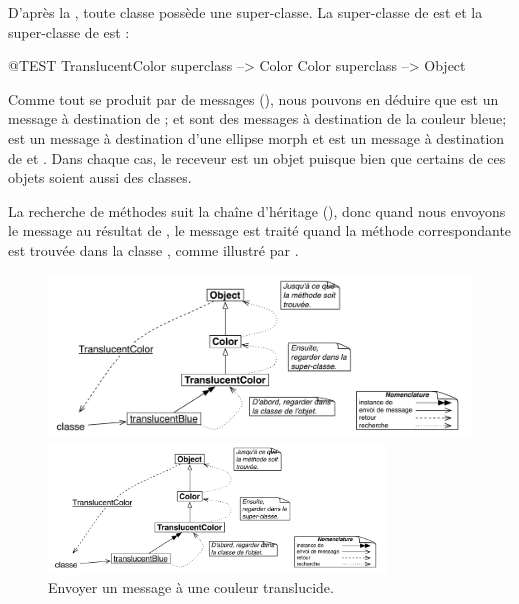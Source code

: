 \documentclass[a4paper,10pt,twoside]{book}
\begin{document}
D'après la ,
toute classe possède une super-classe.
La super-classe de  est  et la super-classe de  est :
\begin{code}{@TEST}
TranslucentColor superclass --> Color
Color superclass                   --> Object
\end{code}

Comme tout se produit par  de messages
(), nous pouvons en déduire que  est un message à destination de ;
 et  sont des messages à
destination de la couleur bleue;  est un
message à destination d'une ellipse morph et
 est un message à destination de
 et . %
Dans chaque cas, le receveur est un objet puisque \mantra bien que certains de ces objets soient aussi des classes.

La recherche de méthodes suit la chaîne d'héritage (), donc quand nous envoyons le message  au résultat de 
, le message est traité quand la méthode correspondante est trouvée dans la classe , comme illustré par .

\begin{center}
\begin{figure}[!ht]
\ifluluelse
	{\centerline{\includegraphics[width=\textwidth]{TranslucentClassMessage}}}
	{\centerline{\includegraphics[width=0.8\textwidth]{TranslucentClassMessage}}}
\caption{Envoyer un message à une couleur translucide.}
\end{figure}
\end{center}
\end{document}
